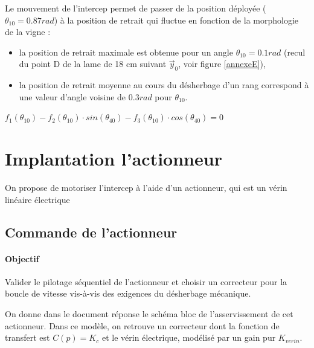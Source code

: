 Le mouvement de l'intercep permet de passer de la position déployée ($\theta_{10}=0.87rad$) à la position de retrait qui fluctue en fonction de la morphologie de la vigne :
\begin{itemize}
 \item la position de retrait maximale est obtenue pour un angle 
$\theta_{10}=0.1 rad$ (recul du point D de la lame de 18 cm suivant $\vec{y}_0$, voir figure \ref{annexeE}),
 \item la position de retrait moyenne au cours du désherbage d'un rang correspond à une valeur d'angle voisine de $0.3rad$ pour $\theta_{10}$.
\end{itemize}



\begin{center}
$f_1(\theta_{10})-f_2(\theta_{10})\cdot	sin(\theta_{40})-f_3(\theta_{10}) \cdot cos(\theta_{40})=0$
\end{center}

\section{Implantation l'actionneur}

On propose de motoriser l'intercep à l'aide d'un actionneur, qui est un vérin linéaire électrique

\subsection{Commande de l'actionneur}

\paragraph{Objectif}

Valider le pilotage séquentiel de l'actionneur et choisir un correcteur pour la boucle de vitesse vis-à-vis des exigences du désherbage mécanique.

On donne dans le document réponse le schéma bloc de l'asservissement de cet actionneur. Dans ce modèle, on retrouve un correcteur dont la fonction de transfert est $C(p)=K_c$ et le vérin électrique, modélisé par un
gain pur $K_{verin}$.

